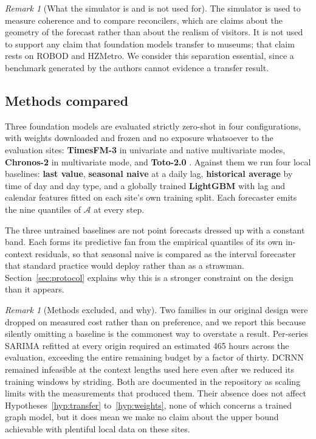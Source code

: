 \documentclass[11pt]{article}
\theoremstyle{plain}
\theoremstyle{definition}
\theoremstyle{remark}
\newtheorem{remark}[theorem]{Remark}
\begin{document}
\begin{remark}[What the simulator is and is not used for]
\label{rem:sim}
The simulator is used to measure coherence and to compare reconcilers, which are claims about the geometry of the forecast rather than about the realism of visitors. It is not used to support any claim that foundation models transfer to museums; that claim rests on ROBOD and HZMetro. We consider this separation essential, since a benchmark generated by the authors cannot evidence a transfer result.
\end{remark}

\subsection{Methods compared}

Three foundation models are evaluated strictly zero-shot in four configurations, with weights downloaded and frozen and no exposure whatsoever to the evaluation sites: \textbf{TimesFM-3} \citep{timesfm3} in univariate and native multivariate modes, \textbf{Chronos-2} \citep{ansari2025chronos2} in multivariate mode, and \textbf{Toto-2.0} \citep{khwaja2026toto2}. Against them we run four local baselines: \textbf{last value}, \textbf{seasonal naive} at a daily lag, \textbf{historical average} by time of day and day type, and a globally trained \textbf{LightGBM} with lag and calendar features fitted on each site's own training split. Each forecaster emits the nine quantiles of $\mathcal{A}$ at every step.

The three untrained baselines are not point forecasts dressed up with a constant band. Each forms its predictive fan from the empirical quantiles of its own in-context residuals, so that seasonal naive is compared as the interval forecaster that standard practice would deploy rather than as a strawman. Section~\ref{sec:protocol} explains why this is a stronger constraint on the design than it appears.

\begin{remark}[Methods excluded, and why]
Two families in our original design were dropped on measured cost rather than on preference, and we report this because silently omitting a baseline is the commonest way to overstate a result. Per-series SARIMA refitted at every origin required an estimated \num{465} hours across the evaluation, exceeding the entire remaining budget by a factor of thirty. DCRNN \citep{li2018dcrnn} remained infeasible at the context lengths used here even after we reduced its training windows by striding. Both are documented in the repository as scaling limits with the measurements that produced them. Their absence does not affect Hypotheses~\ref{hyp:transfer} to~\ref{hyp:weights}, none of which concerns a trained graph model, but it does mean we make no claim about the upper bound achievable with plentiful local data on these sites.
\end{remark}
\end{document}
